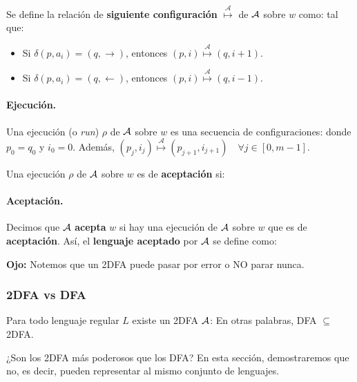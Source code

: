 Se define la relación de \textbf{siguiente configuración} $\stackrel{\mathcal{A}}{\longmapsto}$ de $\mathcal{A}$ sobre $w$ como:
tal que:
\begin{itemize}
    \item Si $\delta(p, a_i) = (q, \rightarrow)$, entonces $(p, i) \stackrel{\mathcal{A}}{\longmapsto}(q, i+1)$.
    \item Si $\delta\left(p, a_i\right)=(q, \leftarrow)$, entonces $(p, i) \stackrel{\mathcal{A}}{\longmapsto}(q, i-1)$.
\end{itemize}

\paragraph{Ejecución.} Una ejecución (o \textit{run}) $\rho$ de $\mathcal{A}$ sobre $w$ es una secuencia de configuraciones:
donde $p_0 = q_0$ y $i_0 = 0$. Además, $\left(p_j, i_j\right) \stackrel{\mathcal{A}}{\longmapsto}\left(p_{j+1}, i_{j+1}\right) \quad \forall j \in[0, m-1]$. \medbreak

Una ejecución $\rho$ de $\mathcal{A}$ sobre $w$ es de \textbf{aceptación} si:

\paragraph{Aceptación.} Decimos que $\mathcal{A}$ \textbf{acepta} $w$ si hay una ejecución de $\mathcal{A}$ sobre $w$ que es de \textbf{aceptación}. Así, el \textbf{lenguaje aceptado} por $\mathcal{A}$ se define como:

\textbf{Ojo:} Notemos que un 2DFA puede pasar por error o NO parar nunca.

\subsubsection{2DFA vs DFA}

Para todo lenguaje regular $L$ existe un 2DFA $\mathcal{A}$:
En otras palabras, DFA $\subseteq$ 2DFA. \bigbreak

¿Son los 2DFA más poderosos que los DFA? En esta sección, demostraremos que no, es decir, pueden representar al mismo conjunto de lenguajes.

